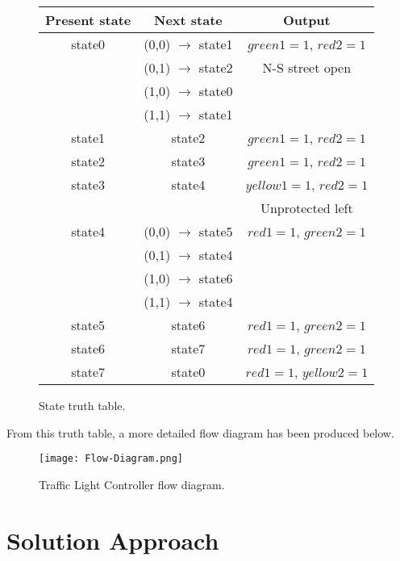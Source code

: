 \begin{figure}[h!]
\centering
\begin{tabular}{|c|c|c|}
	\hline
	\textbf{Present state}	& \textbf{Next state}	& \textbf{Output}	\\
	\hline
	state0	&	(0,0) $\rightarrow$ state1	&	$green1 = 1$, $red2 = 1$	\\
			&	(0,1) $\rightarrow$ state2	&	N-S street open			\\
			&	(1,0) $\rightarrow$ state0	&							\\
			&	(1,1) $\rightarrow$ state1	&							\\
	\hline
	state1	&	state2						&	$green1 = 1$, $red2 = 1$	\\
	\hline
	state2 	&	state3						&	$green1 = 1$, $red2 = 1$	\\
	\hline
	state3	&	state4						&	$yellow1 = 1$, $red2 = 1$\\
			&								&	Unprotected left			\\
	\hline	
	state4	&	(0,0) $\rightarrow$ state5	& 	$red1 = 1$, $green2 = 1$	\\
			&	(0,1) $\rightarrow$ state4	&							\\
			&	(1,0) $\rightarrow$ state6	&							\\
			&	(1,1) $\rightarrow$ state4	&							\\
	\hline
	state5	&	state6						&	$red1 = 1$, $green2 = 1$	\\
	\hline
	state6	&	state7						&	$red1 = 1$, $green2 = 1$	\\
	\hline
	state7	&	state0						&	$red1 = 1$, $yellow2 = 1$\\
	\hline
\end{tabular}
\vspace{0.2cm}
\caption{State truth table.}
\end{figure}

\noindent From this truth table, a more detailed flow diagram has been produced below.

\begin{figure}[h!]
	\centering
	\texttt{[image: Flow-Diagram.png]}
	\caption{Traffic Light Controller flow diagram.}
\end{figure}


%
%

\section{Solution Approach}

